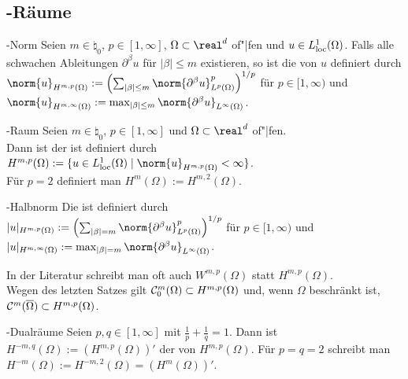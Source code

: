 \subsection{%
    -Räume%
}

\begin{Def}{-Norm}
    Seien $m \in \natural_0$, $p \in [1, \infty]$, $\Omega \subset \real^d$ of"|fen und
    $u \in L^1_{\text{loc}}(\Omega)$.
    Falls alle schwachen Ableitungen $\partial^\beta u$ für $|\beta| \le m$ existieren, so ist
    die  von $u$ definiert durch
    $\norm{u}_{H^{m,p}(\Omega)} :=
    \left(\sum_{|\beta| \le m} \norm{\partial^\beta u}_{L^p(\Omega)}^p\right)^{1/p}$
    für $p \in [1, \infty)$ und
    $\norm{u}_{H^{m,\infty}(\Omega)} :=
    \max_{|\beta| \le m} \norm{\partial^\beta u}_{L^\infty(\Omega)}$.
\end{Def}

\begin{Def}{-Raum}
    Seien $m \in \natural_0$, $p \in [1, \infty]$ und $\Omega \subset \real^d$ of"|fen.\\
    Dann ist der  ist definiert durch
    $H^{m,p}(\Omega) := \{u \in L^1_\loc(\Omega) \;|\; \norm{u}_{H^{m,p}(\Omega)} < \infty\}$.\\
    Für $p = 2$ definiert man
    $H^m(\Omega) := H^{m,2}(\Omega)$.
\end{Def}

\linie

\begin{Def}{-Halbnorm}
    Die  ist definiert durch\\
    $|u|_{H^{m,p}(\Omega)} :=
    \left(\sum_{|\beta| = m} \norm{\partial^\beta u}_{L^p(\Omega)}^p\right)^{1/p}$
    für $p \in [1, \infty)$ und
    $|u|_{H^{m,\infty}(\Omega)} :=
    \max_{|\beta| = m} \norm{\partial^\beta u}_{L^\infty(\Omega)}$.
\end{Def}

\begin{Bem}
    In der Literatur schreibt man oft auch $W^{m,p}(\Omega)$ statt $H^{m,p}(\Omega)$.\\
    Wegen des letzten Satzes gilt $\mathcal{C}^m_0(\Omega) \subset H^{m,p}(\Omega)$ und,
    wenn $\Omega$ beschränkt ist, $\mathcal{C}^m(\overline{\Omega}) \subset H^{m,p}(\Omega)$.
\end{Bem}

\linie

\begin{Def}{-Dualräume}
    Seien $p, q \in [1, \infty]$ mit $\frac{1}{p} + \frac{1}{q} = 1$.
    Dann ist $H^{-m,q}(\Omega) := (H^{m,p}(\Omega))'$ der 
    von $H^{m,p}(\Omega)$.
    Für $p = q = 2$ schreibt man $H^{-m}(\Omega) := H^{-m,2}(\Omega) = (H^m(\Omega))'$.
\end{Def}

